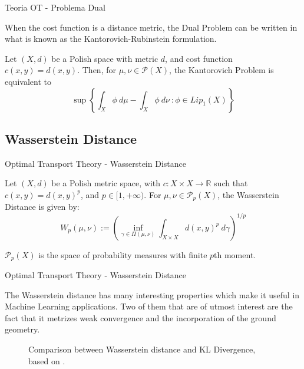 \documentclass[10pt]{beamer}
\begin{document}
\begin{frame}[fragile]{Teoria OT - Problema Dual}

	When the cost function is a distance metric, the Dual Problem can be
	written in what is known as the Kantorovich-Rubinstein formulation.

\begin{theorem}

  Let $(X,d)$ be a Polish space with metric $d$, and cost function $c(x,y) = d(x,y)$.
  Then, for $\mu, \nu \in \mathcal P(X)$, the Kantorovich Problem
  is equivalent to
  \begin{equation}
      \sup \left \{
      \int_X \phi \ d\mu - \int_X \phi \ d\nu \ :
      \phi \in Lip_1(X)
      \right \}
  \end{equation}
  \label{thm:Kantorovich-Rubinstein}
\end{theorem}

\end{frame}

\subsection{Wasserstein Distance}
\begin{frame}[fragile]{Optimal Transport Theory - Wasserstein Distance}

\begin{definition}

  Let $(X,d)$ be a Polish metric space, with $c:X \times X \to \mathbb R$ such that $c(x,y)=d(x,y)^p$, and
  $p \in [1,+\infty)$.
  For $\mu,\nu \in \mathcal P_p(X)$, the Wasserstein Distance is given by:
  \begin{equation}
    W_p(\mu,\nu) :=
    \left(
    \inf_{\gamma \in \Pi(\mu,\nu)}
    \int_{X \times X} d(x,y)^p \ d\gamma
    \right)^{1/p}
    \label{def:Wasserstein}
  \end{equation}
\end{definition}

$\mathcal P_p(X)$ is the space of probability measures with finite $p$th moment.

\end{frame}

\begin{frame}[fragile]{Optimal Transport Theory - Wasserstein Distance}

The Wasserstein distance has many interesting properties which make it useful
in Machine Learning applications. Two of them that are of utmost interest
are the fact that it metrizes weak convergence and the
incorporation of the ground geometry.

\begin{figure}[H]
  \centering
  \def\svgscale{0.50}
  
	\caption{Comparison between Wasserstein distance and KL Divergence, based on \citet{montavon2016boltzmann}.}
	\label{fig:wl-kl}
\end{figure}

\end{frame}
\end{document}
